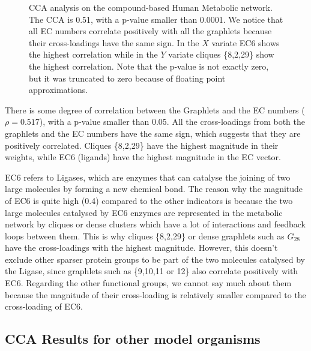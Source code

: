 \begin{figure}
\begin{subfigure}{.65\textwidth}
  \end{subfigure}
  \begin{subfigure}{.25\textwidth}
    \centering 
	
    \gtwenty
    \geleven
    \gnine
    \gdots
    \gtwentynine
    \gtwo
    \geight

  \end{subfigure}
  
\caption[CCA analysis on the compound-based Human Metabolic network.]{CCA analysis on the compound-based Human Metabolic network. The CCA is 0.51, with a p-value smaller than 0.0001. We notice that all EC numbers correlate positively with all the graphlets because their cross-loadings have the same sign. In the $X$ variate EC6 shows the highest correlation while in the $Y$ variate cliques \{8,2,29\} show the highest correlation. Note that the p-value is not exactly zero, but it was truncated to zero because of floating point approximations.}
\label{hsa_metabolic_network_cca}
\end{figure}

There is some degree of correlation between the Graphlets and the EC numbers ($\rho = 0.517 $), with a p-value smaller than 0.05. All the cross-loadings from both the graphlets and the EC numbers have the same sign, which suggests that they are positively correlated. Cliques \{8,2,29\} have the highest magnitude in their weights, while EC6 (ligands) have the highest magnitude in the EC vector. 

EC6 refers to Ligases, which are enzymes that can catalyse the joining of two large molecules by forming a new chemical bond. The reason why the magnitude of EC6 is quite high (0.4) compared to the other indicators is because the two large molecules catalysed by EC6 enzymes are represented in the metabolic network by cliques or dense clusters which have a lot of interactions and feedback loops between them. This is why cliques \{8,2,29\} or dense graphlets such as $G_{28}$ have the cross-loadings with the highest magnitude. However, this doesn't exclude other sparser protein groups to be part of the two molecules catalysed by the Ligase, since graphlets such as \{9,10,11 or 12\} also correlate positively with EC6. Regarding the other functional groups, we cannot say much about them because the magnitude of their cross-loading is relatively smaller compared to the cross-loading of EC6. 


\subsection{CCA Results for other model organisms}

